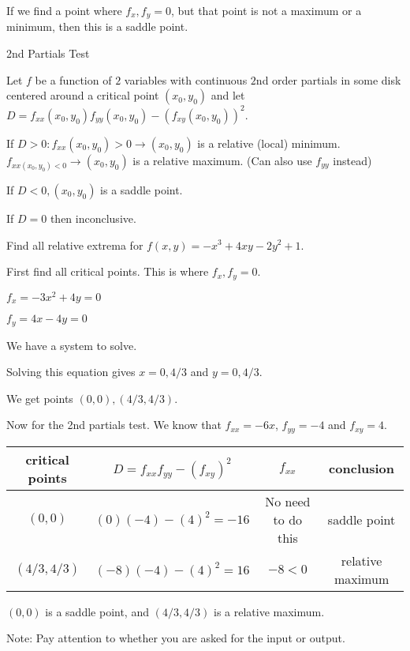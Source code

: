 \documentclass[../calc3.tex]{subfiles}
\begin{document}
If we find a point where $f_x,f_y=0$, but that point is not a maximum or a minimum, then this is a saddle point.

2nd Partials Test 

Let $f$ be a function of $2$ variables with continuous $2$nd order partials in some disk centered around a critical point $(x_0,y_0)$ and let $D=f_{xx}(x_0,y_0)f_{yy}(x_0,y_0)-(f_{xy}(x_0,y_0))^2$.

If $D>0: f_{xx}(x_0,y_0)>0 \rightarrow (x_0,y_0)$ is a relative (local) minimum. $f_{xx(x_0,y_0)<0}\rightarrow (x_0,y_0)$ is a relative maximum. (Can also use $f_{yy}$ instead)

If $D<0,(x_0,y_0)$ is a saddle point.

If $D=0$ then inconclusive.

\pagebreak
\begin{example}
    Find all relative extrema for $f(x,y)=-x^3+4xy-2y^2+1$.

    First find all critical points. This is where $f_x,f_y=0$.

    $f_x=-3x^2+4y =0$

    $f_y=4x-4y=0$

    We have a system to solve.

    Solving this equation gives $x=0, 4/3$ and $y=0,4/3$.

    We get points $(0,0), (4/3,4/3)$.

    Now for the 2nd partials test. We know that $f_{xx}=-6x$, $f_{yy}=-4$ and $f_{xy}=4$.

    \begin{center}
        \begin{tabular}{c|c|c|c}
            critical points & $D=f_{xx}f_{yy}-(f_{xy})^2$ & $f_{xx}$ & conclusion\\\hline
            $(0,0)$ & $(0)(-4)-(4)^2 = -16$ & No need to do this & saddle point \\
            $(4/3,4/3)$ & $(-8)(-4)-(4)^2 = 16$ & $-8<0$ & relative maximum
        \end{tabular}
    \end{center}

    $(0,0)$ is a saddle point, and $(4/3,4/3)$ is a relative maximum.
\end{example}

Note: Pay attention to whether you are asked for the input or output.
\end{document}
